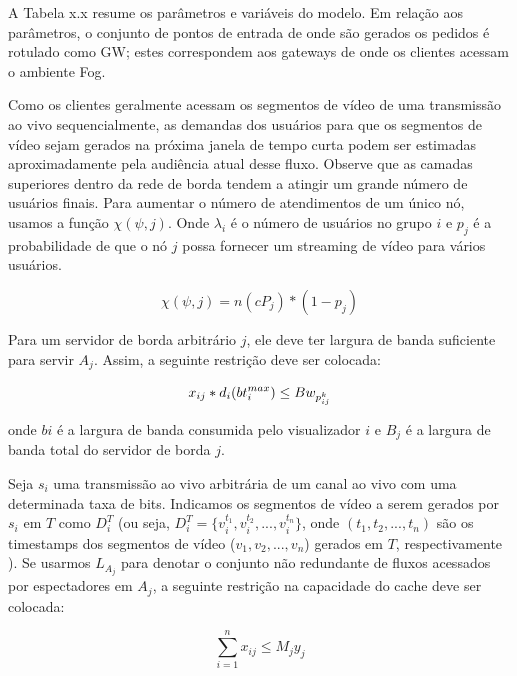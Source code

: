 A Tabela x.x resume os parâmetros e variáveis do modelo. Em relação aos parâmetros, o conjunto de pontos de entrada de onde são gerados os pedidos é rotulado como GW; estes correspondem aos gateways de onde os clientes acessam o ambiente Fog.


Como os clientes geralmente acessam os segmentos de vídeo de uma transmissão ao vivo sequencialmente, as demandas dos usuários para que os segmentos de vídeo sejam gerados na próxima janela de tempo curta podem ser estimadas aproximadamente pela audiência atual desse fluxo. Observe que as camadas superiores dentro da rede de borda tendem a atingir um grande número de usuários finais.
Para aumentar o número de atendimentos de um único nó, usamos a função $\chi(\psi, j)$. Onde $\lambda_{i}$ é o número de usuários no grupo $i$ e $p_{j}$ é a probabilidade de que o nó $j$ possa fornecer um streaming de vídeo para vários usuários.

\begin{equation}\label{cost_func}
\chi(\psi, j) = n(cP_{j}) * (1 - p_{j})
\end{equation}
\vspace{.05cm}

Para um servidor de borda arbitrário $j$, ele deve ter largura de banda suficiente para servir $A_j$. Assim, a seguinte restrição deve ser colocada:

\begin{equation}
x_{ij} * d_{i}( bt_{i}^{max}) \leq Bw_{p_{ij}^{k}} \\
\end{equation}
\vspace{.05cm}

onde $bi$ é a largura de banda consumida pelo visualizador $i$ e $B_j$ é a largura de banda total do servidor de borda $j$.

Seja $s_i$ uma transmissão ao vivo arbitrária de um canal ao vivo com uma determinada taxa de bits. Indicamos os segmentos de vídeo a serem gerados por $s_i$ em $T$ como $D^T_i$ (ou seja, $D^T_i = \{ v^{t_1}_i, v^{t_2}_i, ..., v ^{t_n}_i \}$, onde $(t_1,t_2,...,t_n)$ são os timestamps dos segmentos de vídeo ($v_1,v_2, ..., v_n$) gerados em $T$, respectivamente ). Se usarmos $L_{A_j}$ para denotar o conjunto não redundante de fluxos acessados por espectadores em $A_j$, a seguinte restrição na capacidade do cache deve ser colocada:

\begin{equation}
\sum^{n}_{i=1} x_{ij} \leq M_{j}y_{j}
\end{equation}
\vspace{.05cm}

